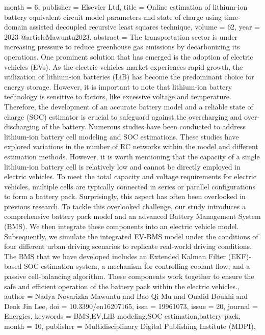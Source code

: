 {{{{{{{{{   month = {6},
   publisher = {Elsevier Ltd},
   title = {Online estimation of lithium-ion battery equivalent circuit model parameters and state of charge using time-domain assisted decoupled recursive least squares technique},
   volume = {62},
   year = {2023}
}
@article{Mawuntu2023,
   abstract = {The transportation sector is under increasing pressure to reduce greenhouse gas emissions by decarbonizing its operations. One prominent solution that has emerged is the adoption of electric vehicles (EVs). As the electric vehicles market experiences rapid growth, the utilization of lithium-ion batteries (LiB) has become the predominant choice for energy storage. However, it is important to note that lithium-ion battery technology is sensitive to factors, like excessive voltage and temperature. Therefore, the development of an accurate battery model and a reliable state of charge (SOC) estimator is crucial to safeguard against the overcharging and over-discharging of the battery. Numerous studies have been conducted to address lithium-ion battery cell modeling and SOC estimations. These studies have explored variations in the number of RC networks within the model and different estimation methods. However, it is worth mentioning that the capacity of a single lithium-ion battery cell is relatively low and cannot be directly employed in electric vehicles. To meet the total capacity and voltage requirements for electric vehicles, multiple cells are typically connected in series or parallel configurations to form a battery pack. Surprisingly, this aspect has often been overlooked in previous research. To tackle this overlooked challenge, our study introduces a comprehensive battery pack model and an advanced Battery Management System (BMS). We then integrate these components into an electric vehicle model. Subsequently, we simulate the integrated EV-BMS model under the conditions of four different urban driving scenarios to replicate real-world driving conditions. The BMS that we have developed includes an Extended Kalman Filter (EKF)-based SOC estimation system, a mechanism for controlling coolant flow, and a passive cell-balancing algorithm. These components work together to ensure the safe and efficient operation of the battery pack within the electric vehicles.},
   author = {Nadya Novarizka Mawuntu and Bao Qi Mu and Oualid Doukhi and Deok Jin Lee},
   doi = {10.3390/en16207165},
   issn = {19961073},
   issue = {20},
   journal = {Energies},
   keywords = {BMS,EV,LiB modeling,SOC estimation,battery pack},
   month = {10},
   publisher = {Multidisciplinary Digital Publishing Institute (MDPI)},
}}}}}}}}}
